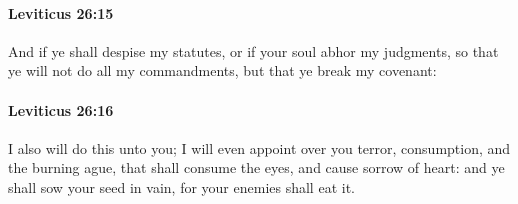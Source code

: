 		\paragraph{Leviticus 26:15} %
			\label{LEVITICUS-26-15}

			And if ye shall despise my statutes, or if your soul abhor my judgments, so that ye will not do all my commandments, but that ye break my covenant:


		\paragraph{Leviticus 26:16} %
			\label{LEVITICUS-26-16}

			I also will do this unto you; I will even appoint over you terror, consumption, and the burning ague, that shall consume the eyes, and cause sorrow of heart: and ye shall sow your seed in vain, for your enemies shall eat it.

